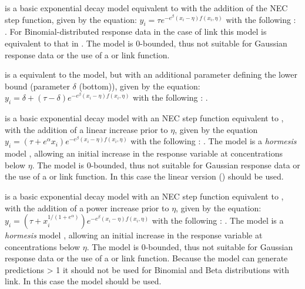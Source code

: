 \documentclass[
  shortnames]{jss}
\begin{document}
 is a basic exponential decay model equivalent to  with the addition of the NEC step function, given by the equation:
\(y_i = \tau e^{-e^{\beta} \left(x_i - \eta \right) f(x_i, \eta)}\)
with the following : . For Binomial-distributed response data in the case of  link this model is equivalent to that in \citet{Fox2010}. The model is 0-bounded, thus not suitable for Gaussian response data or the use of a  or  link function.

 is a equivalent to the  model, but with an additional parameter defining the lower bound (parameter \(\delta\) (bottom)), given by the equation:
\(y_i = \delta + (\tau - \delta) e^{-e^{\beta} \left(x_i - \eta \right) f(x_i, \eta)}\)
with the following : .

 is a basic exponential decay model with an NEC step function equivalent to , with the addition of a linear increase prior to \(\eta\), given by the equation
\(y_i = (\tau + e^{\alpha} x_i) e^{-e^{\beta} \left(x_i - \eta \right) f(x_i, \eta)}\)
with the following : . The  model is a \emph{hormesis} model \citep{Mattson2008}, allowing an initial increase in the response variable at concentrations below \(\eta\). The model is 0-bounded, thus not suitable for Gaussian response data or the use of a  or  link function. In this case the linear version () should be used.

 is a basic exponential decay model with an NEC step function equivalent to , with the addition of a power increase prior to \(\eta\), given by the equation:
\(y_i = (\tau + x_i^{1/(1+e^{\alpha})}) e^{-e^{\beta} \left(x_i - \eta \right) f(x_i, \eta)}\)
with the following : . The  model is a \emph{hormesis} model \citep{Mattson2008}, allowing an initial increase in the response variable at concentrations below \(\eta\). The model is 0-bounded, thus not suitable for Gaussian response data or the use of a  or  link function. Because the model can generate predictions \textgreater{} 1 it should not be used for Binomial and Beta distributions with  link. In this case the  model should be used.
\end{document}
